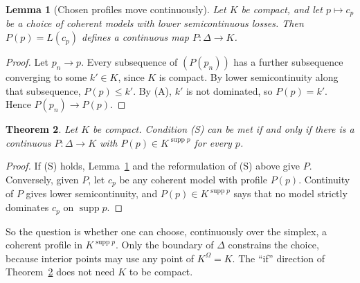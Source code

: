 \documentclass[11pt]{article}
\newtheorem{theorem}{Theorem}[section]
\newtheorem{lemma}[theorem]{Lemma}
\theoremstyle{definition}
\theoremstyle{remark}
\newcommand{\supp}{\operatorname{supp}}
\begin{document}
\begin{lemma}[Chosen profiles move continuously]\label{lem:profcont}
Let $K$ be compact, and let $p\mapsto c_p$ be a choice of coherent models with lower semicontinuous losses. Then $P(p)=L(c_p)$ defines a continuous map $P:\Delta\to K$.
\end{lemma}
\begin{proof}
Let $p_n\to p$. Every subsequence of $(P(p_n))$ has a further subsequence converging to some $k'\in K$, since $K$ is compact. By lower semicontinuity along that subsequence, $P(p)\le k'$. By (A), $k'$ is not dominated, so $P(p)=k'$. Hence $P(p_n)\to P(p)$.
\end{proof}

\begin{theorem}\label{thm:selection}
Let $K$ be compact. Condition (S) can be met if and only if there is a continuous $P:\Delta\to K$ with $P(p)\in K^{\supp p}$ for every $p$.
\end{theorem}
\begin{proof}
If (S) holds, Lemma~\ref{lem:profcont} and the reformulation of (S) above give $P$. Conversely, given $P$, let $c_p$ be any coherent model with profile $P(p)$. Continuity of $P$ gives lower semicontinuity, and $P(p)\in K^{\supp p}$ says that no model strictly dominates $c_p$ on $\supp p$.
\end{proof}
So the question is whether one can choose, continuously over the simplex, a coherent profile in $K^{\supp p}$. Only the boundary of $\Delta$ constrains the choice, because interior points may use any point of $K^\Omega=K$. The ``if'' direction of Theorem~\ref{thm:selection} does not need $K$ to be compact.
\end{document}
